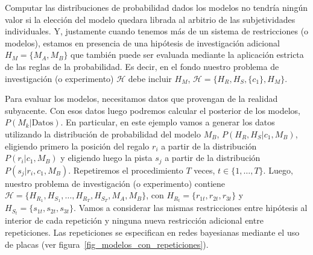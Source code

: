 \documentclass[a4paper,11pt]{book}
\theoremstyle{definition}
\begin{document}
Computar las distribuciones de probabilidad dados los modelos no tendr\'ia ning\'un valor si la elecci\'on del modelo quedara librada al arbitrio de las subjetividades individuales.
%
Y, justamente cuando tenemos m\'as de un sistema de restricciones (o modelos), estamos en presencia de una hip\'otesis de investigaci\'on adicional $H_M = \{M_A, M_B\}$ que tambi\'en puede ser evaluada mediante la aplicaci\'on estricta de las reglas de la probabilidad.
Es decir, en el fondo nuestro problema de investigaci\'on (o experimento) $\mathcal{H}$ debe incluir $H_M$, $\mathcal{H} = \{H_R, H_S, \{c_1\}, H_M\}$.


Para evaluar los modelos, necesitamos datos que provengan de la realidad subyacente.
%
Con esos datos luego podremos calcular el posterior de los modelos, $P(M_k|\text{Datos})$.
%
En particular, en este ejemplo vamos a generar los datos utilizando la distribuci\'on de probabilidad del modelo $M_B$, $P(H_R,H_S|c_1,M_B)$, eligiendo primero la posici\'on del regalo $r_i$ a partir de la distribuci\'on $P(r_i|c_1,M_B)$ y eligiendo luego la pista $s_j$ a partir de la distribuci\'on $P(s_j|r_i,c_1,M_B)$.
%
Repetiremos el procedimiento $T$ veces, $t \in \{1, \dots, T\}$.
%
Luego, nuestro problema de investigaci\'on (o experimento) contiene $\mathcal{H} = \{H_{R_1}, H_{S_1}, \dots, H_{R_T}, H_{S_T}, M_A, M_B\}$, con $H_{R_t} = \{r_{1t}, r_{2t}, r_{3t}\}$ y $H_{S_t} = \{s_{1t}, s_{2t}, s_{3t} \}$.
%
Vamos a considerar las mismas restricciones entre hip\'otesis al interior de cada repetici\'on y ninguna nueva restricci\'on adicional entre repeticiones.
%
Las repeticiones se especifican en redes bayesianas mediante el uso de placas (ver figura~\ref{fig_modelos_con_repeticiones}).
%
\end{document}
